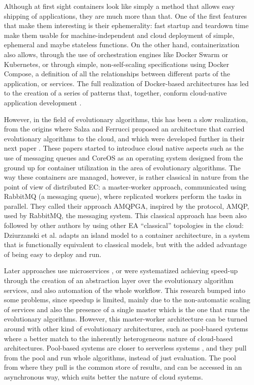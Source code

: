 \documentclass[review]{elsarticle}
\begin{document}
Although at first sight containers look like simply a method that
allows easy shipping of applications, they are much more than
that. One of the first features that make them interesting is their
ephemerality: fast startup and teardown time make them usable for
machine-independent and cloud deployment of simple, ephemeral and
maybe stateless functions. On the other hand, containerization also
allows, through the use of orchestration engines like Docker Swarm or
Kubernetes, or through simple, non-self-scaling specifications using
Docker Compose, a definition of all the relationships between
different parts of the application, or services. The full realization
of Docker-based architectures has led to the creation of a series of
patterns that, together, conform cloud-native application development
\cite{kratzke2017understanding}.

However, in the field of evolutionary algorithms, this has been a slow
realization, from the origins where Salza and Ferrucci
\cite{salza2016approach,salza2016develop} proposed an architecture
that carried evolutionary algorithms to the cloud, and which were
developed further in their next paper \cite{de2017parallel}. These
papers started to introduce cloud native aspects such as the use of
messaging queues and CoreOS as an operating system designed from the
ground up for container utilization in the area of evolutionary
algorithms. The way these containers are managed, however, is rather
classical in nature from the point of view of distributed EC: a
master-worker approach, communicated using RabbitMQ (a messaging
queue), where replicated workers perform the tasks in parallel. They
called their approach AMQPGA, inspired by the protocol, AMQP, used by
RabbitMQ, the messaging system. This classical approach has been also
followed by other authors by using other EA ``classical'' topologies
in the cloud: Dziurzanski et al. \cite{dziurzanski2020scalable} adapts an island model to
a container architecture, in a system that is functionally equivalent
to classical models, but with the added advantage of being easy to
deploy and run.

Later approaches use microservices \cite{khalloof2018generic}, or were
systematized \cite{salza2019speed} achieving speed-up through the
creation of an abstraction layer over the evolutionary algorithm
services, and also automation of the whole workflow. This research
bumped into some problems, since speedup is limited, mainly due to the
non-automatic scaling of services and also the presence of a single
master which is the one that runs the evolutionary
algorithms. However, this master-worker architecture can be turned
around with other kind of evolutionary architectures, such
as pool-based systems
\cite{valenzuela2015implementing,merelo2012sofea,sofea:cec2012} where
a better match to the inherently heterogeneous nature of cloud-based
architectures. Pool-based systems are closer to serverless systems
\cite{malawski2017serverless}, and they pull from the pool and run
whole algorithms, instead of just evaluation. The pool from where they
pull is the common store of results, and can be accessed in an
asynchronous way, which suits better the nature of cloud systems.
\end{document}
